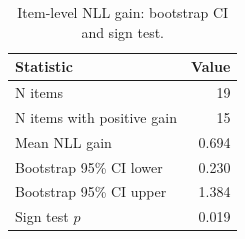 \begin{table}[htbp]
\centering
\caption{Item-level NLL gain: bootstrap CI and sign test.}
\label{tab:item-bootstrap}
\begin{tabular}{lr}
\toprule
Statistic & Value \\
\midrule
N items & 19 \\
N items with positive gain & 15 \\
Mean NLL gain & 0.694 \\
Bootstrap 95\% CI lower & 0.230 \\
Bootstrap 95\% CI upper & 1.384 \\
Sign test $p$ & 0.019 \\
\bottomrule
\end{tabular}
\end{table}
